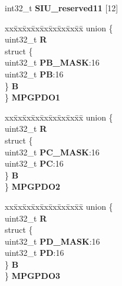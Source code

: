 \begin{DoxyCompactItemize}
\begin{tabbing}
\end{tabbing}\item 
\mbox{\label{structSIU__tag_a8b19b9897080c5036e2289343fe41977}} 
int32\+\_\+t {\bfseries S\+I\+U\+\_\+reserved11} \mbox{[}12\mbox{]}
\item 
\mbox{\label{structSIU__tag_afa16753436a4574499bb3b057f9d141d}} 
\begin{tabbing}
xx\=xx\=xx\=xx\=xx\=xx\=xx\=xx\=xx\=\kill
union \{\\
\>uint32\_t {\bfseries R}\\
\>struct \{\\
\>\>uint32\_t {\bfseries PB\_MASK}:16\\
\>\>uint32\_t {\bfseries PB}:16\\
\>\} {\bfseries B}\\
\} {\bfseries MPGPDO1}\\

\end{tabbing}\item 
\mbox{\label{structSIU__tag_a69638a73e3e1c65e7dc657ecb03ce871}} 
\begin{tabbing}
xx\=xx\=xx\=xx\=xx\=xx\=xx\=xx\=xx\=\kill
union \{\\
\>uint32\_t {\bfseries R}\\
\>struct \{\\
\>\>uint32\_t {\bfseries PC\_MASK}:16\\
\>\>uint32\_t {\bfseries PC}:16\\
\>\} {\bfseries B}\\
\} {\bfseries MPGPDO2}\\

\end{tabbing}\item 
\mbox{\label{structSIU__tag_aef2d56638acd8b38d917e7281b588726}} 
\begin{tabbing}
xx\=xx\=xx\=xx\=xx\=xx\=xx\=xx\=xx\=\kill
union \{\\
\>uint32\_t {\bfseries R}\\
\>struct \{\\
\>\>uint32\_t {\bfseries PD\_MASK}:16\\
\>\>uint32\_t {\bfseries PD}:16\\
\>\} {\bfseries B}\\
\} {\bfseries MPGPDO3}\\


\end{tabbing}
\end{DoxyCompactItemize}
